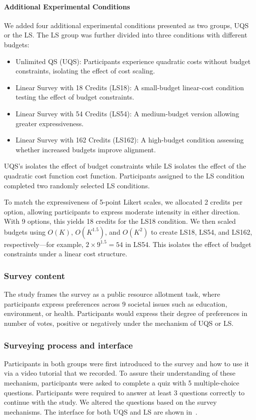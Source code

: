 \paragraph{Additional Experimental Conditions}
We added four additional experimental conditions presented as two groups, UQS or the LS. The LS group was further divided into three conditions with different budgets:

\begin{itemize}
    \item Unlimited QS (UQS): Participants experience quadratic costs without budget constraints, isolating the effect of cost scaling.
    \item Linear Survey with 18 Credits (LS18): A small-budget linear-cost condition testing the effect of budget constraints.
    \item Linear Survey with 54 Credits (LS54): A medium-budget version allowing greater expressiveness.
    \item Linear Survey with 162 Credits (LS162): A high-budget condition assessing whether increased budgets improve alignment.
\end{itemize}

UQS's isolates the effect of budget constraints while LS isolates the effect of the quadratic cost function cost function. Participants assigned to the LS condition completed two randomly selected LS conditions.

To match the expressiveness of 5-point Likert scales, we allocated 2 credits per option, allowing participants to express moderate intensity in either direction. With 9 options, this yields 18 credits for the LS18 condition. We then scaled budgets using $O(K)$, $O(K^{1.5})$, and $O(K^2)$ to create LS18, LS54, and LS162, respectively—for example, $2 \times 9^{1.5}=54$ in LS54. This isolates the effect of budget constraints under a linear cost structure.

\subsubsection{Survey content}
The study frames the survey as a public resource allotment task, where participants express preferences across 9 societal issues such as education, environment, or health. Participants would express their degree of preferences in number of votes, positive or negatively under the mechanism of UQS or LS.

\subsubsection{Surveying process and interface}
Participants in both groups were first introduced to the survey and how to use it via a video tutorial that we recorded. To assure their understanding of these mechanism, participants were asked to complete a quiz with 5 multiple-choice questions. Participants were required to answer at least 3 questions correctly to continue with the study. We altered the questions based on the survey mechanisms. The interface for both UQS and LS are shown in~.

